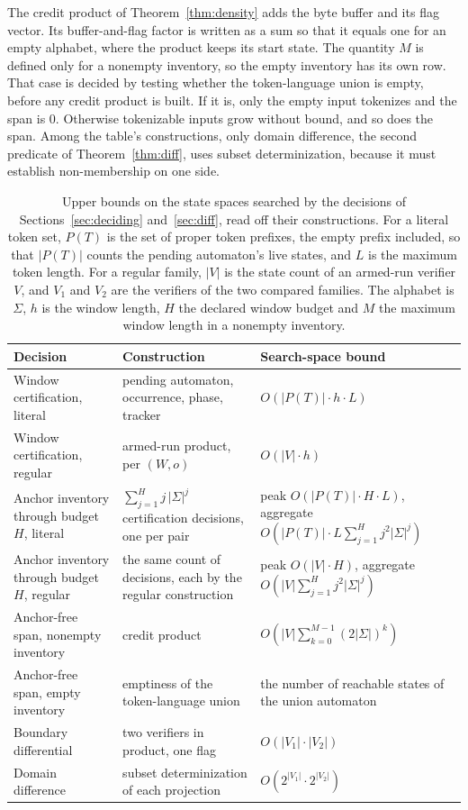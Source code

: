 \documentclass[11pt,a4paper]{article}
\theoremstyle{definition}
\theoremstyle{plain}
\begin{document}
The credit product of Theorem~\ref{thm:density} adds the byte buffer and its flag vector. Its buffer-and-flag factor is
written as a sum so that it equals one for an empty alphabet, where the product keeps its start state. The quantity $M$
is defined only for a nonempty inventory, so the empty inventory has its own row. That case is decided by testing
whether the token-language union is empty, before any credit product is built. If it is, only the empty input tokenizes
and the span is $0$. Otherwise tokenizable inputs grow without bound, and so does the span. Among the table's
constructions, only domain difference, the second predicate of Theorem~\ref{thm:diff}, uses subset determinization,
because it must establish non-membership on one side.

\begin{table}[!htbp]
\centering
\begin{tabular}{@{}L{0.3\textwidth}L{0.27\textwidth}L{0.36\textwidth}@{}}
\toprule
Decision & Construction & Search-space bound \\
\midrule
Window certification, literal & pending automaton, occurrence, phase, tracker & $O(|P(T)| \cdot h \cdot L)$ \\
\addlinespace
Window certification, regular & armed-run product, per $(W, o)$ & $O(|V| \cdot h)$ \\
\addlinespace
Anchor inventory through budget $H$, literal & $\sum_{j=1}^{H} j\,|\Sigma|^{j}$ certification decisions, one per
pair & peak $O(|P(T)| \cdot H \cdot L)$, aggregate $O(|P(T)| \cdot L \sum_{j=1}^{H} j^{2} |\Sigma|^{j})$ \\
\addlinespace
Anchor inventory through budget $H$, regular & the same count of decisions, each by the regular construction & peak
$O(|V| \cdot H)$, aggregate $O(|V| \sum_{j=1}^{H} j^{2} |\Sigma|^{j})$ \\
\addlinespace
Anchor-free span, nonempty inventory & credit product & $O(|V| \sum_{k=0}^{M-1} (2|\Sigma|)^{k})$ \\
\addlinespace
Anchor-free span, empty inventory & emptiness of the token-language union & the number of reachable states of the union
automaton \\
\addlinespace
Boundary differential & two verifiers in product, one flag & $O(|V_{1}| \cdot |V_{2}|)$ \\
\addlinespace
Domain difference & subset determinization of each projection & $O(2^{|V_{1}|} \cdot 2^{|V_{2}|})$ \\
\bottomrule
\end{tabular}
\caption{Upper bounds on the state spaces searched by the decisions of Sections~\ref{sec:deciding} and~\ref{sec:diff},
read off their constructions. For a literal token set, $P(T)$ is the set of proper token prefixes, the empty prefix
included, so that $|P(T)|$ counts the pending automaton's live states, and $L$ is the maximum token length. For a
regular family, $|V|$ is the state count of an armed-run verifier $V$, and $V_{1}$ and $V_{2}$ are the verifiers of the
two compared families. The alphabet is $\Sigma$, $h$ is the window length, $H$ the declared window budget and $M$ the
maximum window length in a nonempty inventory.}
\label{tab:cost}
\end{table}
\end{document}
